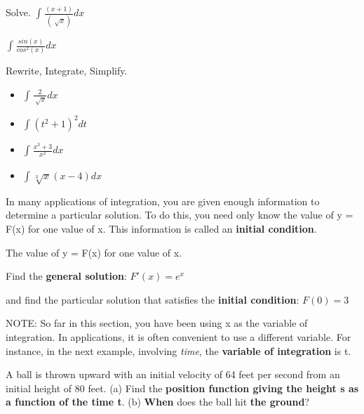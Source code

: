 \documentclass{article}
\theoremstyle{mytheoremstyle}
\theoremstyle{mytheoremstyle}
\theoremstyle{myproblemstyle}
\begin{document}
    \begin{problem}
        Solve. $ \int_{}^{} \frac{(x+1)}{(\sqrt[]{x})}  dx$
    \end{problem}

    \begin{problem}
        $ \int_{}^{} \frac{sin(x)}{cos^2(x)} dx$
    \end{problem}

    \begin{problem}
        Rewrite, Integrate, Simplify.
        \begin{itemize}
            \item $ \int_{}^{} \frac{2}{\sqrt[]{x}} dx$
            \item $ \int_{}^{} (t^2 + 1)^2 dt$
            \item $ \int_{}^{} \frac{x^3+3}{x^2} dx$
            \item $ \int_{}^{} \sqrt[3]{x} (x - 4) dx$
        \end{itemize}
    \end{problem}

    \begin{definition}
        In many applications of integration, you are given enough information to determine a particular solution.
        To do this, you need only know the value of y = F(x) for one value of x. This information is 
        called an \textbf{initial condition}.
    \end{definition}

    \begin{definition}
        The value of y = F(x) for one value of x.
    \end{definition}

    \begin{problem}
        Find the \textbf{general solution}: $ F'(x) = e^x $
        
        and find the particular solution that satisfies the \textbf{initial condition}: $ F(0) = 3 $
    \end{problem}

    NOTE: So far in this section, you have been using x as the variable of integration.
    In applications, it is often convenient to use a different variable. For instance, in the next
    example, involving \textit{time}, the \textbf{variable of integration} is t.

    \begin{problem}
        A ball is thrown upward with an initial velocity of 64 feet per second from an initial
        height of 80 feet. (a) Find the \textbf{position function giving the height s as a function of the time t}.
        (b) \textbf{When} does the ball hit \textbf{the ground}?
    \end{problem}

    
\end{document}
